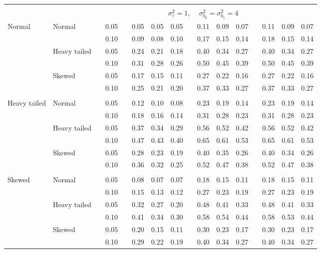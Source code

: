 \documentclass[11pt]{article} %
\begin{document}
\begin{table}[ht]
\begin{scriptsize}
\begin{center}
\begin{tabular}{ll p{.1cm} c p{.1cm} rrr p{.1cm} rrr p{.1cm} rrr}
&&&&&&&&&&&&&&&\\
& && && \multicolumn{9}{c}{$\sigma_{\varepsilon}^2 = 1$, \ \ $\sigma_{b_0}^2 = \sigma_{b_1}^2 = 4$} \\ \cline{6-16}
Normal       & Normal       && 0.05 &&  0.05 & 0.05 & 0.05 && 0.11 & 0.09 & 0.07 && 0.11 & 0.09 & 0.07 \\ 
             &              && 0.10 &&  0.09 & 0.08 & 0.10 && 0.17 & 0.15 & 0.14 && 0.18 & 0.15 & 0.14 \\ 
             & Heavy tailed && 0.05 &&  0.24 & 0.21 & 0.18 && 0.40 & 0.34 & 0.27 && 0.40 & 0.34 & 0.27 \\ 
             &              && 0.10 &&  0.31 & 0.28 & 0.26 && 0.50 & 0.45 & 0.39 && 0.50 & 0.45 & 0.39 \\ 
             & Skewed       && 0.05 &&  0.17 & 0.15 & 0.11 && 0.27 & 0.22 & 0.16 && 0.27 & 0.22 & 0.16 \\ 
             &              && 0.10 &&  0.25 & 0.21 & 0.20 && 0.37 & 0.33 & 0.27 && 0.37 & 0.33 & 0.27 \\ 
             &&&&&&&&&&&&&&&\\
Heavy tailed & Normal       && 0.05 &&  0.12 & 0.10 & 0.08 && 0.23 & 0.19 & 0.14 && 0.23 & 0.19 & 0.14 \\ 
             &              && 0.10 &&  0.18 & 0.16 & 0.14 && 0.31 & 0.28 & 0.23 && 0.31 & 0.28 & 0.23 \\ 
             & Heavy tailed && 0.05 &&  0.37 & 0.34 & 0.29 && 0.56 & 0.52 & 0.42 && 0.56 & 0.52 & 0.42 \\ 
             &              && 0.10 &&  0.47 & 0.43 & 0.40 && 0.65 & 0.61 & 0.53 && 0.65 & 0.61 & 0.53 \\ 
             & Skewed       && 0.05 &&  0.28 & 0.23 & 0.19 && 0.40 & 0.35 & 0.26 && 0.40 & 0.34 & 0.26 \\ 
             &              && 0.10 &&  0.36 & 0.32 & 0.25 && 0.52 & 0.47 & 0.38 && 0.52 & 0.47 & 0.38 \\ 
             &&&&&&&&&&&&&&&\\
Skewed       & Normal       && 0.05 &&  0.08 & 0.07 & 0.07 && 0.18 & 0.15 & 0.11 && 0.18 & 0.15 & 0.11 \\ 
             &              && 0.10 &&  0.15 & 0.13 & 0.12 && 0.27 & 0.23 & 0.19 && 0.27 & 0.23 & 0.19 \\ 
             & Heavy tailed && 0.05 &&  0.32 & 0.27 & 0.20 && 0.48 & 0.41 & 0.33 && 0.48 & 0.41 & 0.33 \\ 
             &              && 0.10 &&  0.41 & 0.34 & 0.30 && 0.58 & 0.54 & 0.44 && 0.58 & 0.53 & 0.44 \\ 
             & Skewed       && 0.05 &&  0.20 & 0.15 & 0.11 && 0.30 & 0.23 & 0.17 && 0.30 & 0.23 & 0.17 \\ 
             &              && 0.10 &&  0.29 & 0.22 & 0.19 && 0.40 & 0.34 & 0.27 && 0.40 & 0.34 & 0.27 \\ 


   \hline
\end{tabular}
\end{center}
\end{scriptsize}
\end{table}
\end{document}
